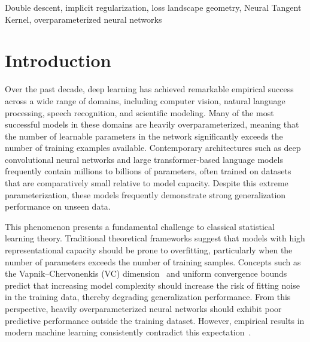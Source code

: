 \documentclass[conference]{IEEEtran}
\begin{document}
\begin{abstract}
The findings demonstrate that generalization in overparameterized models is strongly influenced by the interaction between network architecture, optimization algorithms, and the geometry of the loss landscape. Smaller batch sizes consistently produced lower test error and flatter minima. Sparse subnetworks retaining only 10\% of original parameters achieved within 1.15 percentage points of full model performance when retrained from their original initialization. These results contribute to a deeper theoretical understanding of modern deep learning systems and highlight the need for revised learning-theoretic frameworks capable of explaining generalization in high-dimensional model regimes.
\end{abstract}

\begin{IEEEkeywords}
Double descent, implicit regularization, loss landscape geometry, Neural Tangent Kernel, overparameterized neural networks
\end{IEEEkeywords}

\section{Introduction}

Over the past decade, deep learning has achieved remarkable empirical success across a wide range of domains, including computer vision, natural language processing, speech recognition, and scientific modeling. Many of the most successful models in these domains are heavily overparameterized, meaning that the number of learnable parameters in the network significantly exceeds the number of training examples available. Contemporary architectures such as deep convolutional neural networks and large transformer-based language models frequently contain millions to billions of parameters, often trained on datasets that are comparatively small relative to model capacity. Despite this extreme parameterization, these models frequently demonstrate strong generalization performance on unseen data.

This phenomenon presents a fundamental challenge to classical statistical learning theory. Traditional theoretical frameworks suggest that models with high representational capacity should be prone to overfitting, particularly when the number of parameters exceeds the number of training samples. Concepts such as the Vapnik--Chervonenkis (VC) dimension~\cite{vapnik1971uniform} and uniform convergence bounds predict that increasing model complexity should increase the risk of fitting noise in the training data, thereby degrading generalization performance. From this perspective, heavily overparameterized neural networks should exhibit poor predictive performance outside the training dataset. However, empirical results in modern machine learning consistently contradict this expectation~\cite{zhang2017understanding}.
\end{document}
